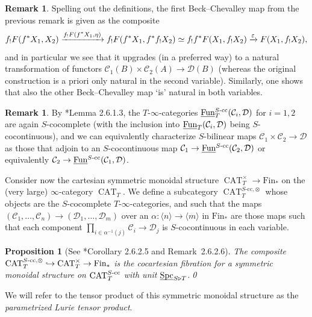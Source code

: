 \documentclass[reqno]{memo-l}
\theoremstyle{mythm}
\newtheorem{prop}[thm]{Proposition}
\theoremstyle{definition}
\newtheorem{rk}[thm]{Remark}
\numberwithin{equation}{section}
\newcommand{\Cc}{{\mathcal{C}}}
\newcommand{\Dd}{{\mathcal{D}}}
\renewcommand{\epsilon}{\varepsilon}
\DeclareMathOperator{\Spc}{Spc}
\DeclareMathOperator{\CAT}{CAT}
\newcommand{\Fun}{{\textup{Fun}}}
\newcommand{\ulhelper}[2]{\underline{\setbox0=\hbox{$#1#2$}\dp0=0.4pt \box0\relax}}
\newcommand{\ul}[1]{{\mathpalette\ulhelper{#1}}\hbox{\rule[-2pt]{0pt}{0pt}}}
\begin{document}
\begin{rk}
    Spelling out the definitions, the first Beck--Chevalley map from the previous remark is given as the composite
    \[
        f_!F(f^*X_1,X_2)\hskip0pt minus .75pt\xrightarrow{f_!F(f^*X_1,\eta)\hskip0pt plus .5pt}\hskip0pt minus .75pt
        f_!F(f^*X_1,f^*f_!X_2)\simeq
        f_!f^*F(X_1,f_!X_2)\hskip0pt minus .75pt\xrightarrow{\epsilon\hskip0pt plus .5pt}\hskip0pt minus .75ptF(X_1,f_!X_2),
    \]
    and in particular we see that it upgrades (in a preferred way) to a natural transformation of functors $\Cc_1(B)\times\Cc_2(A)\to\Dd(B)$ (whereas the original construction is a priori only natural in the second variable). Similarly, one shows that also the other Beck--Chevalley map `is' natural in both variables.
\end{rk}

\begin{rk}\label{rk:charact-bilinear}
    By \cite{martiniwolf2022presentable}*{Lemma 2.6.1.3}, the $T$-$\infty$-categories $\ul\Fun^\text{$S$-cc}_T(\Cc_i,\Dd)$ for $i=1,2$ are again $S$-cocomplete (with the inclusion into $\ul\Fun_T(\Cc_i,\Dd)$ being $S$-cocontinuous), and we can equivalently characterize $S$-bilinear maps $\Cc_1\times\Cc_2\to\Dd$ as those that adjoin to an $S$-cocontinuous map $\Cc_1\to\ul\Fun^\text{$S$-cc}(\Cc_2,\Dd)$ or equivalently $\Cc_2\to\ul\Fun^\text{$S$-cc}(\Cc_1,\Dd)$.
\end{rk}

Consider now the cartesian symmetric monoidal structure $\CAT_T^\times\to\text{Fin}_*$ on the (very large) $\infty$-category $\CAT_T$. We define a subcategory $\CAT_T^{\text{$S$-cc},\otimes}$ whose objects are the $S$-cocomplete $T$-$\infty$-categories, and such that the maps $(\Cc_1,\dots,\Cc_n)\to(\Dd_1,\dots,\Dd_m)$ over an $\alpha\colon\langle n\rangle\to\langle m\rangle$ in $\text{Fin}_*$ are those maps such that each component $\prod_{i\in\alpha^{-1}(j)}\Cc_i\to\Dd_j$ is $S$-cocontinuous in each variable.

\begin{prop}[See \cite{martiniwolf2022presentable}*{Corollary 2.6.2.5 and Remark~2.6.2.6}]\label{prop:lurie-tensor-exists}
    The composite $\CAT_T^{\textup{$S$-cc},\otimes}\hookrightarrow\CAT_T^\times\to\textup{Fin}_*$ is the cocartesian fibration for a symmetric monoidal structure on $\CAT_T^\textup{$S$-cc}$ with unit $\ul\Spc_{S\triangleright T}$.\qed
\end{prop}

We will refer to the tensor product of this symmetric monoidal structure as the \emph{parametrized Lurie tensor product}.
\end{document}
